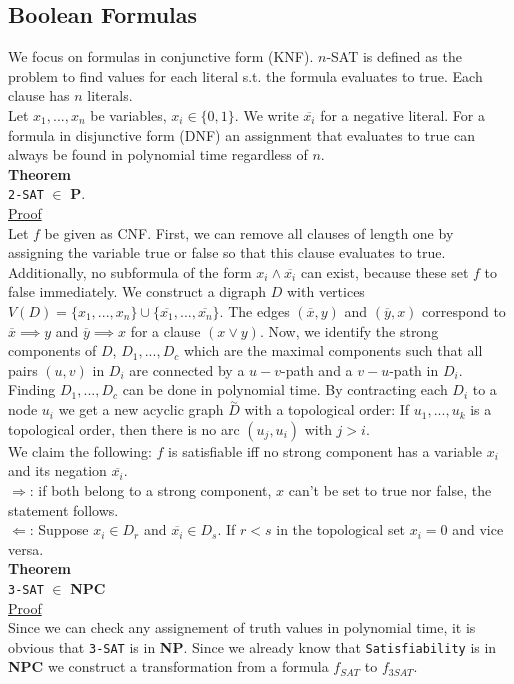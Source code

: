 \documentclass[a4paper, 12pt]{article}
\begin{document}
	\subsection{Boolean Formulas}
	We focus on formulas in conjunctive form (KNF). $n$-SAT is defined as the problem to find values for each literal s.t. the formula evaluates to true. Each clause has $n$ literals.\\
	Let $x_1,...,x_n$ be variables, $x_i \in \{0,1\}$. We write $\overline{x_i}$ for a negative literal. For a formula in disjunctive form (DNF) an assignment that evaluates to true can always be found in polynomial time regardless of $n$.\\
	\textbf{Theorem}\\
	\texttt{2-SAT} $\in$ \textbf{P}.\\
	\underline{Proof}\\
	Let $f$ be given as CNF. First, we can remove all clauses of length one by assigning the variable true or false so that this clause evaluates to true. Additionally, no subformula of the form $x_i \land \overline{x_i}$ can exist, because these set $f$ to false immediately. We construct a digraph $D$ with vertices $V(D) = \{x_1,...,x_n\} \cup \{\overline{x_1},...,\overline{x_n}\}$. The edges $(\overline{x}, y)$ and $(\overline{y}, x)$ correspond to $\overline{x} \implies y$ and $\overline{y} \implies x$ for a clause $(x\lor y)$. Now, we identify the strong components of $D$, $D_1,...,D_c$ which are the maximal components such that all pairs $(u,v)$ in $D_i$ are connected by a $u-v$-path and a $v-u$-path in $D_i$. Finding $D_1,...,D_c$ can be done in polynomial time. By contracting each $D_i$ to a node $u_i$ we get a new acyclic graph $\overset{\sim}{D}$ with a topological order: If $u_1,...,u_k$ is a topological order, then there is no arc $(u_j,u_i)$ with $j>i$.\\
	We claim the following: $f$ is satisfiable iff no strong component has a variable $x_i$ and its negation $\overline{x_i}$.\\
	$\Rightarrow$: if both belong to a strong component, $x$ can't be set to true nor false, the statement follows.\\
	$\Leftarrow$: Suppose $x_i \in D_r$ and $\overline{x_i} \in D_s$. If $r<s$ in the topological set $x_i = 0$ and vice versa.\\
	\textbf{Theorem}\\
	\texttt{3-SAT} $\in$ \textbf{NPC}\\
	\underline{Proof}\\
	Since we can check any assignement of truth values in polynomial time, it is obvious that \texttt{3-SAT} is in \textbf{NP}. Since we already know that \texttt{Satisfiability} is in \textbf{NPC} we construct a transformation from a formula $f_{SAT}$ to $f_{3SAT}$.\\
\end{document}

